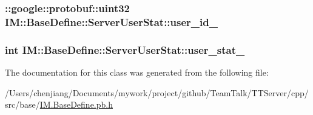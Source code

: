 \subsubsection[{user\+\_\+id\+\_\+}]{\setlength{\rightskip}{0pt plus 5cm}\+::google\+::protobuf\+::uint32 I\+M\+::\+Base\+Define\+::\+Server\+User\+Stat\+::user\+\_\+id\+\_\+\hspace{0.3cm}{\ttfamily [private]}}\label{class_i_m_1_1_base_define_1_1_server_user_stat_a561b5a4310823d1e0e11558fc635ade7}
\hypertarget{class_i_m_1_1_base_define_1_1_server_user_stat_aae7569096dc97fa83c608384dcdf8b2d}{}
\subsubsection[{user\+\_\+stat\+\_\+}]{\setlength{\rightskip}{0pt plus 5cm}int I\+M\+::\+Base\+Define\+::\+Server\+User\+Stat\+::user\+\_\+stat\+\_\+\hspace{0.3cm}{\ttfamily [private]}}\label{class_i_m_1_1_base_define_1_1_server_user_stat_aae7569096dc97fa83c608384dcdf8b2d}


The documentation for this class was generated from the following file\+:\begin{DoxyCompactItemize}
\item 
/\+Users/chenjiang/\+Documents/mywork/project/github/\+Team\+Talk/\+T\+T\+Server/cpp/src/base/\hyperlink{_i_m_8_base_define_8pb_8h}{I\+M.\+Base\+Define.\+pb.\+h}\end{DoxyCompactItemize}
